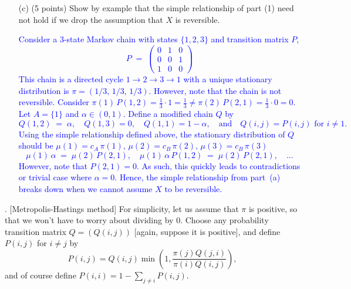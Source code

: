 \documentclass{article}
\begin{document}
\begin{itemize}
    \item[(c)] (5 points) Show by example that the simple relationship of part (1) need not hold if we drop the assumption that $X$ is reversible.

    \textcolor{blue}{Consider a 3-state Markov chain with states $\{1,2,3\}$ and transition matrix $P$,
\[
  P \;=\;
  \begin{pmatrix}
    0 & 1 & 0 \\
    0 & 0 & 1 \\
    1 & 0 & 0
  \end{pmatrix}
\]
This chain is a directed cycle $1 \to 2 \to 3 \to 1$ with a unique stationary distribution is $\pi = (1/3,\,1/3,\,1/3)$. 
However, note that the chain is not reversible. Consider $\pi(1)\,P(1,2) = \tfrac13\cdot 1 = \tfrac13 \neq \pi(2)\,P(2,1)=\tfrac13 \cdot 0=0$.
\smallskip
Let $A=\{1\}$ and $\alpha\in(0,1)$. Define a modified chain $Q$ by
\[
  Q(1,2) \;=\; \alpha,\quad Q(1,3)=0,\quad Q(1,1)=1-\alpha,
  \quad
  \text{and}
  \quad
  Q(i,j)=P(i,j) \text{ for }i\neq 1.
\]
Using the simple relationship defined above, the stationary distribution of $Q$ should be
\(\mu(1)= c_A\,\pi(1),\,\mu(2)=c_B\,\pi(2),\,\mu(3)=c_B\,\pi(3)\)
\[
  \mu(1)\,\alpha
  \;=\;
  \mu(2)\,P(2,1),
  \quad
  \mu(1)\,\alpha\,P(1,2)
  \;=\;
  \mu(2)\,P(2,1), 
  \quad
  \ldots
\]
However, note that $P(2,1)=0$. As such, this quickly leads to contradictions or trivial case where $\alpha=0$. 
Hence, the simple relationship from part~(a) breaks down when we cannot assume $X$ to be reversible.
}
\end{itemize}

\bigskip

. [Metropolis-Hastings method] For simplicity, let us assume that $\pi$ is positive, so that we won’t have to worry about dividing by 0. Choose any probability transition matrix $Q = (Q(i,j))$ [again, suppose it is positive], and define $P(i,j)$ for $i \neq j$ by
\[
P(i,j) = Q(i,j) \min \left( 1, \frac{\pi(j)Q(j,i)}{\pi(i)Q(i,j)} \right),
\]
and of course define $P(i,i) = 1 - \sum_{j \neq i} P(i,j)$. 
\end{document}
